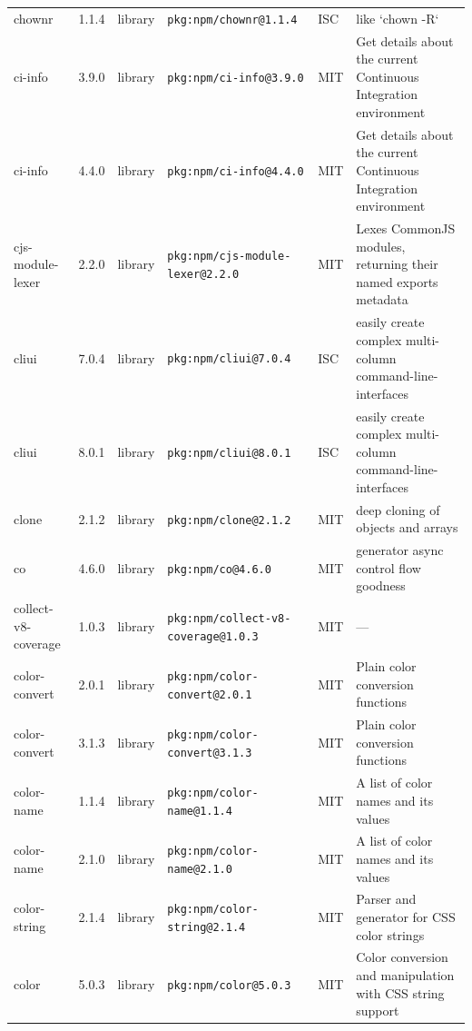 \documentclass[11pt,a4paper]{article}
\begin{document}
\begin{longtable}{|p{4cm}|p{2cm}|p{1.6cm}|p{5cm}|p{1.5cm}|p{3.5cm}|}
\raggedright chownr & 1.1.4 & library & \small\texttt{pkg:npm/chownr@1.1.4} & ISC & \small like `chown -R` \\
\raggedright ci-info & 3.9.0 & library & \small\texttt{pkg:npm/ci-info@3.9.0} & MIT & \small Get details about the current Continuous Integration environment \\
\raggedright ci-info & 4.4.0 & library & \small\texttt{pkg:npm/ci-info@4.4.0} & MIT & \small Get details about the current Continuous Integration environment \\
\raggedright cjs-module-lexer & 2.2.0 & library & \small\texttt{pkg:npm/cjs-module-lexer@2.2.0} & MIT & \small Lexes CommonJS modules, returning their named exports metadata \\
\raggedright cliui & 7.0.4 & library & \small\texttt{pkg:npm/cliui@7.0.4} & ISC & \small easily create complex multi-column command-line-interfaces \\
\raggedright cliui & 8.0.1 & library & \small\texttt{pkg:npm/cliui@8.0.1} & ISC & \small easily create complex multi-column command-line-interfaces \\
\raggedright clone & 2.1.2 & library & \small\texttt{pkg:npm/clone@2.1.2} & MIT & \small deep cloning of objects and arrays \\
\raggedright co & 4.6.0 & library & \small\texttt{pkg:npm/co@4.6.0} & MIT & \small generator async control flow goodness \\
\raggedright collect-v8-coverage & 1.0.3 & library & \small\texttt{pkg:npm/collect-v8-coverage@1.0.3} & MIT & \small — \\
\raggedright color-convert & 2.0.1 & library & \small\texttt{pkg:npm/color-convert@2.0.1} & MIT & \small Plain color conversion functions \\
\raggedright color-convert & 3.1.3 & library & \small\texttt{pkg:npm/color-convert@3.1.3} & MIT & \small Plain color conversion functions \\
\raggedright color-name & 1.1.4 & library & \small\texttt{pkg:npm/color-name@1.1.4} & MIT & \small A list of color names and its values \\
\raggedright color-name & 2.1.0 & library & \small\texttt{pkg:npm/color-name@2.1.0} & MIT & \small A list of color names and its values \\
\raggedright color-string & 2.1.4 & library & \small\texttt{pkg:npm/color-string@2.1.4} & MIT & \small Parser and generator for CSS color strings \\
\raggedright color & 5.0.3 & library & \small\texttt{pkg:npm/color@5.0.3} & MIT & \small Color conversion and manipulation with CSS string support \\

\end{longtable}
\end{document}
